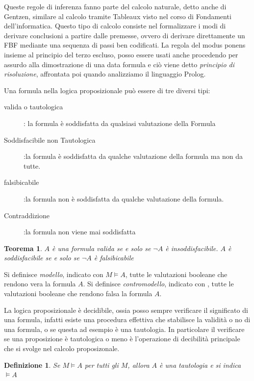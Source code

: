 \documentclass[a4paper]{report}
\newtheorem{defi}{Definizione}%
\newtheorem{teorema}{Teorema}[chapter]
\begin{document}
Queste regole di inferenza fanno parte del calcolo naturale, detto anche di Gentzen, similare al calcolo tramite Tableaux visto nel corso
di Fondamenti dell'informatica.\newline
Questo tipo di calcolo consiste nel formalizzare i modi di derivare conclusioni a partire dalle premesse, ovvero di derivare direttamente un FBF
mediante una sequenza di passi ben codificati.\newline
La regola del modus ponens  insieme al principio del terzo escluso, posso essere usati anche procedendo per assurdo alla dimostrazione
di una data formula e ciò viene detto \emph{principio di risoluzione}, affrontata poi quando analizziamo il linguaggio Prolog.

Una formula nella logica proposizionale può essere di tre diversi tipi:
\begin{description}
    \item[valida o tautologica]: la formula è soddisfatta da qualsiasi valutazione della Formula
    \item[Soddisfacibile non Tautologica]:la formula è soddisfatta da qualche valutazione
                        della formula ma non da tutte.
    \item[falsibicabile]:la formula non è soddisfatta da qualche valutazione della formula.
    \item[Contraddizione]:la formula non viene mai soddisfatta
\end{description}

\begin{teorema}
$A$ è una formula valida se e solo se $\neg A$ è insoddisfacibile.
$A$ è soddisfacibile se e solo se $\neg A$ è falsibicabile
\end{teorema}

Si definisce \emph{modello}, indicato con $M \models A$, tutte le valutazioni booleane
che rendono vera la formula $A$.
Si definisce \emph{contromodello}, indicato con , tutte le valutazioni booleane
che rendono falsa la formula $A$.

La logica proposizionale è decidibile, ossia posso sempre verificare il significato di una formula, infatti esiste
una procedura effettiva che stabilisce la validità o no di una formula, o se questa ad esempio è una tautologia.
In particolare il verificare se una proposizione è tautologica o meno è l’operazione di decibilità principale che si svolge
nel calcolo proposizonale.

\begin{defi}
    Se $M \models A$ per tutti gli $M$, allora $A$ è una tautologia e si indica $\models A$
\end{defi}
\end{document}
